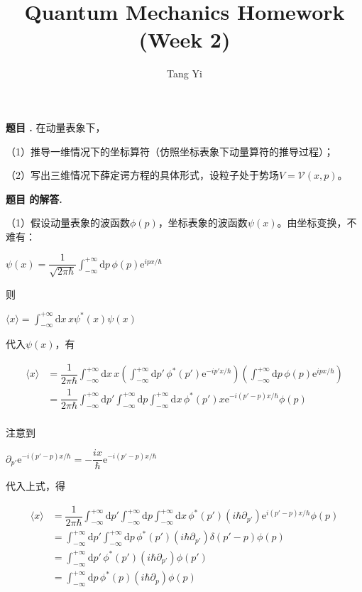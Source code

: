 \documentclass[12pt, a4paper, oneside]{ctexart}
\title{Quantum Mechanics Homework (Week 2)}
\author{Tang Yi \\ [学号已脱敏]}
\newcounter{problemname}
\newenvironment{problem}
  {\begin{shaded}\stepcounter{problemname}\par\noindent\textbf{题目 \theproblemname. }}
  {\end{shaded}\par}
\newenvironment{solution}
  {\par\noindent\textbf{题目 \theproblemname 的解答. }}
  {\par}
\begin{document}
\maketitle

\begin{problem}
    在动量表象下，

    （1）推导一维情况下的坐标算符（仿照坐标表象下动量算符的推导过程）；

    （2）写出三维情况下薛定谔方程的具体形式，设粒子处于势场$V =\mathcal{V}(x,p)$。
\end{problem}

\begin{solution}

    （1）假设动量表象的波函数$\phi(p)$，坐标表象的波函数$\psi(x)$。由坐标变换，不难有：

    \centerline{$\psi(x) = \dfrac{1}{\sqrt{2\pi \hbar}} \displaystyle \int_{-\infty}^{+\infty} \mathrm{d}p \, \phi(p) \mathrm{e}^{ipx/\hbar}$}

    则

    \centerline{$\langle x\rangle = \displaystyle \int_{-\infty}^{+\infty} \mathrm{d}x \, x \psi^*(x) \psi(x)$}

    代入$\psi(x)$，有

    \begin{align*}
        \langle x\rangle &= \dfrac{1}{2\pi \hbar} \displaystyle \int_{-\infty}^{+\infty} \mathrm{d}x \, x \left( \displaystyle \int_{-\infty}^{+\infty} \mathrm{d}p' \, \phi^*(p') \mathrm{e}^{-ip'x/\hbar} \right) \left( \displaystyle \int_{-\infty}^{+\infty} \mathrm{d}p \, \phi(p) \mathrm{e}^{ipx/\hbar} \right) \\
        &= \dfrac{1}{2\pi \hbar} \displaystyle \int_{-\infty}^{+\infty} \mathrm{d}p'  \displaystyle \int_{-\infty}^{+\infty} \mathrm{d}p   \displaystyle \int_{-\infty}^{+\infty} \mathrm{d}x \,  \phi^*(p') x  \mathrm{e}^{-i(p'-p)x/\hbar} \phi(p)\\
    \end{align*}

    注意到
    
    \centerline{$\partial_{p'} \mathrm{e}^{-i(p'-p)x/\hbar} = -\dfrac{ix}{\hbar}\mathrm{e}^{-i(p'-p)x/\hbar}$}

    代入上式，得

    \begin{align*}
        \langle x\rangle &= \dfrac{1}{2\pi \hbar} \displaystyle \int_{-\infty}^{+\infty} \mathrm{d}p'  \displaystyle \int_{-\infty}^{+\infty} \mathrm{d}p   \displaystyle \int_{-\infty}^{+\infty} \mathrm{d}x \,  \phi^*(p') (i\hbar \partial_{p'})  \mathrm{e}^{i(p'-p)x/\hbar} \phi(p)\\
        &= \displaystyle \int_{-\infty}^{+\infty} \mathrm{d}p'  \displaystyle \int_{-\infty}^{+\infty} \mathrm{d}p   \,  \phi^*(p') (i\hbar \partial_{p'}) \delta(p'-p) \phi(p)\\
        &= \displaystyle \int_{-\infty}^{+\infty} \mathrm{d}p'  \,  \phi^*(p') (i\hbar \partial_{p'}) \phi(p') \\
        &= \displaystyle \int_{-\infty}^{+\infty} \mathrm{d}p \,  \phi^*(p) (i\hbar \partial_{p}) \phi(p)
    \end{align*}


\end{solution}
\end{document}
